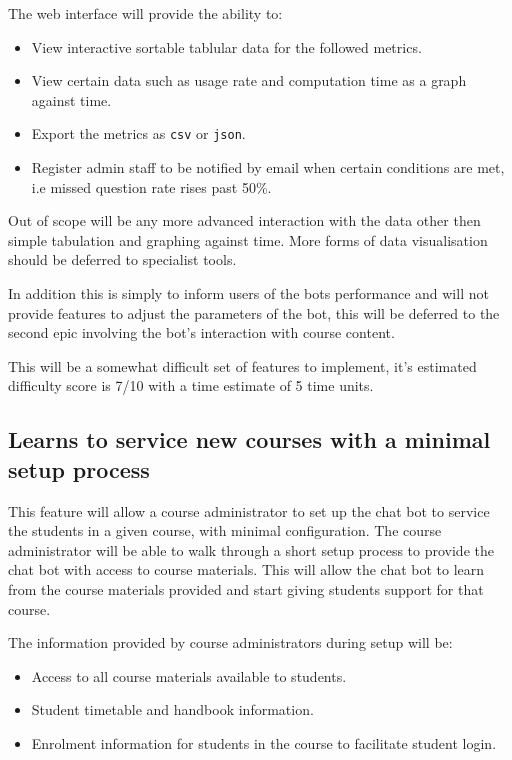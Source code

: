 \documentclass{article}
\begin{document}
The web interface will provide the ability to:
\begin{itemize}
  \item View interactive sortable tablular data for the followed metrics.
  \item View certain data such as usage rate and computation time as a graph against time.
  \item Export the metrics as \texttt{csv} or \texttt{json}.
  \item Register admin staff to be notified by email when certain conditions are met, i.e missed question rate rises past 50\%.
\end{itemize}

Out of scope will be any more advanced interaction with the data other then simple tabulation and graphing against time. More forms of data visualisation should be deferred to specialist tools. 

In addition this is simply to inform users of the bots performance and will not provide features to adjust the parameters of the bot, this will be deferred to the second epic involving the bot's interaction with course content. 

This will be a somewhat difficult set of features to implement, it's estimated difficulty score is 7/10 with a time estimate of 5 time units.

\subsection{Learns to service new courses with a minimal setup process}

This feature will allow a course administrator to set up the chat bot to service the students in a given course, with minimal configuration.
The course administrator will be able to walk through a short setup process to provide the chat bot with access to course materials.
This will allow the chat bot to learn from the course materials provided and start giving students support for that course. 

The information provided by course administrators during setup will be:
\begin{itemize}
  \item Access to all course materials available to students.
  \item Student timetable and handbook information.
  \item Enrolment information for students in the course to facilitate student login.
\end{itemize}
\end{document}
